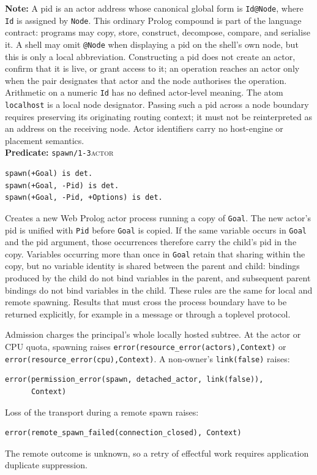 \smallskip
\noindent \textbf{Note:} A pid is an actor address whose canonical global form
is \texttt{Id@Node}, where \texttt{Id} is assigned by \texttt{Node}. This
ordinary Prolog compound is part of the language contract: programs may copy,
store, construct, decompose, compare, and serialise it. A shell may omit
\texttt{@Node} when displaying a pid on the shell's own node, but this is only
a local abbreviation. Constructing a pid does not create an actor, confirm
that it is live, or grant access to it; an operation reaches an actor only when
the pair designates that actor and the node authorises the operation.
Arithmetic on a numeric \texttt{Id} has no defined actor-level meaning.
The atom \texttt{localhost} is a local node designator. Passing such a pid
across a node boundary requires preserving its originating routing context;
it must not be reinterpreted as an address on the receiving node. Actor
identifiers carry no host-engine or placement semantics.\\

\noindent \textbf{Predicate:} \texttt{spawn/\allowbreak{}1-3}\hfill\textsc{actor}

\begin{verbatim}
spawn(+Goal) is det.
spawn(+Goal, -Pid) is det.
spawn(+Goal, -Pid, +Options) is det.
\end{verbatim}

\noindent Creates a new Web Prolog actor process running a copy
of \texttt{Goal}. The new actor's pid is unified with \texttt{Pid} before
\texttt{Goal} is copied. If the same variable occurs in \texttt{Goal} and
the pid argument, those occurrences therefore carry the child's pid in the
copy. Variables occurring more than once in \texttt{Goal} retain
that sharing within the copy, but no variable identity is shared between the
parent and child: bindings produced by the child do not bind variables in the
parent, and subsequent parent bindings do not bind variables in the child.
These rules are the same for local and remote spawning. Results that must
cross the process boundary have to be returned explicitly, for example in a
message or through a toplevel protocol. 

Admission charges the principal's whole locally hosted subtree.
At the actor or CPU quota, spawning raises
\texttt{error(\allowbreak{}resource\_\allowbreak{}error(\allowbreak{}actors),\allowbreak{}Context)} or
\texttt{error(\allowbreak{}resource\_\allowbreak{}error(\allowbreak{}cpu),\allowbreak{}Context)}. A non-owner's
\texttt{link(\allowbreak{}false)} raises:
\begin{verbatim}
error(permission_error(spawn, detached_actor, link(false)),
      Context)
\end{verbatim}
\noindent Loss of the transport during a remote spawn raises:
\begin{verbatim}
error(remote_spawn_failed(connection_closed), Context)
\end{verbatim}
\noindent The remote outcome is unknown, so a retry of effectful work
requires application duplicate suppression.

